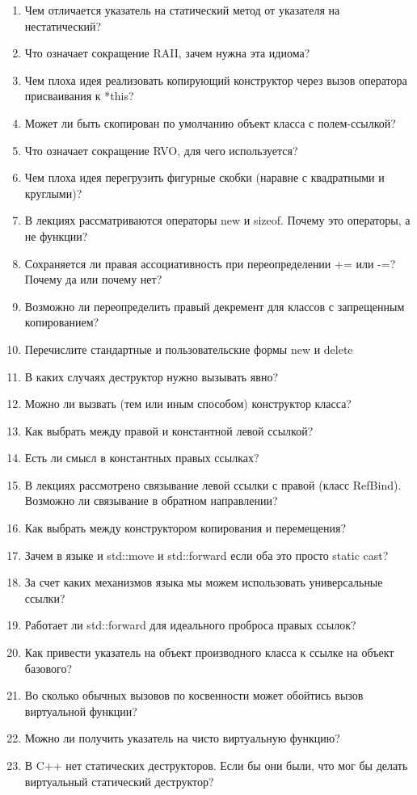 \documentclass[a4paper,12pt,oneside]{article}
\begin{document}
\begin{enumerate}
\item Чем отличается указатель на статический метод от указателя на нестатический?
\item Что означает сокращение RAII, зачем нужна эта идиома?
\item Чем плоха идея реализовать копирующий конструктор через вызов оператора присваивания к *this?
\item Может ли быть скопирован по умолчанию объект класса с полем-ссылкой?
\item Что означает сокращение RVO, для чего используется?
\item Чем плоха идея перегрузить фигурные скобки (наравне с квадратными и круглыми)?
\item В лекциях рассматриваются операторы new и sizeof. Почему это операторы, а не функции?
\item Сохраняется ли правая ассоциативность при переопределении += или -=? Почему да или почему нет?
\item Возможно ли переопределить правый декремент для классов с запрещенным копированием?
\item Перечислите стандартные и пользовательские формы new и delete
\item В каких случаях деструктор нужно вызывать явно?
\item Можно ли вызвать (тем или иным способом) конструктор класса?
\item Как выбрать между правой и константной левой ссылкой?
\item Есть ли смысл в константных правых ссылках?
\item В лекциях рассмотрено связывание левой ссылки с правой (класс RefBind). Возможно ли связывание в обратном направлении?
\item Как выбрать между конструктором копирования и перемещения?
\item Зачем в языке и std::move и std::forward если оба это просто static cast?
\item За счет каких механизмов языка мы можем использовать универсальные ссылки?
\item Работает ли std::forward для идеального проброса правых ссылок?
\item Как привести указатель на объект производного класса к ссылке на объект базового?
\item Во сколько обычных вызовов по косвенности может обойтись вызов виртуальной функции?
\item Можно ли получить указатель на чисто виртуальную функцию?
\item В C++ нет статических деструкторов. Если бы они были, что мог бы делать виртуальный статический деструктор?

\end{enumerate}
\end{document}
